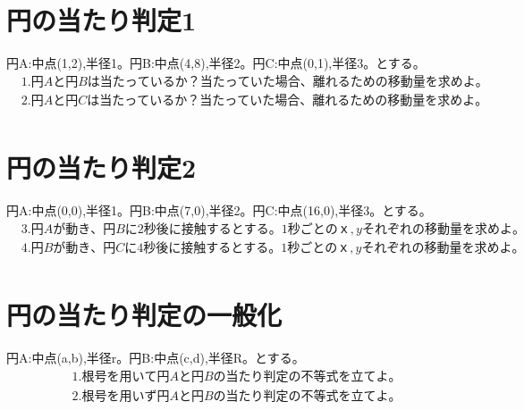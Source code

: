 \documentclass[paper=b4j,landscape,twocolumn,fleqn]{jlreq}
\begin{document}
\section{円の当たり判定1}
円A:中点(1,2),半径1。円B:中点(4,8),半径2。円C:中点(0,1),半径3。とする。
\begin{align*}
　&1.　円Aと円Bは当たっているか？　当たっていた場合、離れるための移動量を求めよ。\\[1em]
　&2.　円Aと円Cは当たっているか？　当たっていた場合、離れるための移動量を求めよ。\\[1em]
\end{align*}
\section{円の当たり判定2}
円A:中点(0,0),半径1。円B:中点(7,0),半径2。円C:中点(16,0),半径3。とする。
\begin{align*}
　&3.　円Aが動き、円Bに2秒後に接触するとする。1秒ごとのｘ,yそれぞれの移動量を求めよ。\\[1em]
　&4.　円Bが動き、円Cに4秒後に接触するとする。1秒ごとのｘ,yそれぞれの移動量を求めよ。\\[1em]
\end{align*}
\section{円の当たり判定の一般化}
円A:中点(a,b),半径r。円B:中点(c,d),半径R。とする。
\begin{align*}
　&1.　根号を用いて円Aと円Bの当たり判定の不等式を立てよ。\\[1em]
　&2.　根号を用いず円Aと円Bの当たり判定の不等式を立てよ。\\[1em]
\end{align*}
\end{document}
